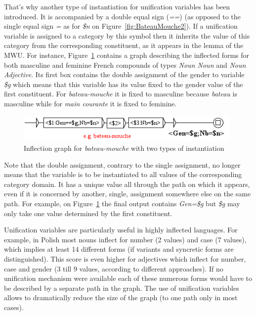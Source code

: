 \bigskip
\noindent That's why another type of instantiation for unification variables has been introduced. 
It is accompanied by a double equal sign (\emph{==}) (as opposed to the 
single equal sign \emph{=} as for \emph{\$n} on Figure~\ref{fig:BateauMouche2}). 
If a unification variable is assigned to a category by this symbol then it
inherits the value of this category from the corresponding constituent, as it appears in the lemma of 
the MWU. For instance, Figure~\ref{fig:BateauMouche3} contains a graph describing the inflected 
forms for both masculine and feminine French compounds of types \emph{Noun Noun} and 
\emph{Noun Adjective}. Its first box contains the double assignment of the gender to variable 
\emph{\$g} which means that this variable has its value fixed to the gender value of the first 
constituent. For \emph{bateau-mouche} it is fixed to masculine because \emph{bateau} is 
masculine while for \emph{main courante} it is fixed to feminine. 

\begin{figure}[!htb]
  \centering
  \includegraphics[width=11cm]{resources/img/BateauMouche3.png}
  \caption{Inflection graph for \emph{bateau-mouche} with two types of instantiation}
  \label{fig:BateauMouche3}
\end{figure}

\bigskip
\noindent Note that the double assignment, contrary to the single assignment, no longer means 
that the variable is to be instantiated to all values of the corresponding category domain. It 
has a unique value all through the path on which it appears, even if it is concerned by another, 
single, assignment somewhere else on the same path. For example, on Figure~\ref{fig:BateauMouche3} 
the final output contains \emph{Gen=\$g} but \emph{\$g} may only take one value determined by the 
first constituent.

\bigskip
\noindent Unification variables are particularly useful in highly inflected languages. For 
example, in Polish most nouns inflect for number (2 values) and case (7 values), which implies 
at least 14 different forms (if variants and syncretic forms are distinguished). This score is 
even higher for adjectives which inflect for number, case and gender (3 till 9 values, according 
to different approaches). If no unification mechanism were available each of these numerous 
forms would have to be described by a separate path in the graph. The use of unification variables 
allows to dramatically reduce the size of the graph (to one path only in most cases). 

